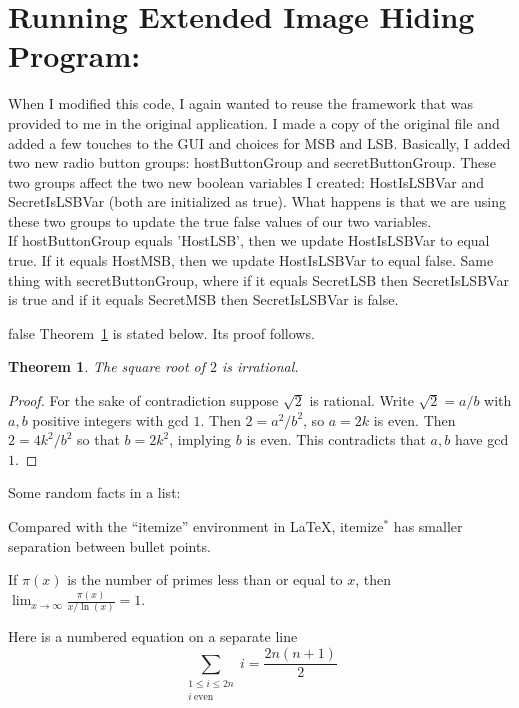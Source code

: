 \documentclass[10pt]{article}
\newenvironment{itemize*}%
  {\vspace{-2ex} \begin{itemize} %
     \setlength{\itemsep}{-1ex} \setlength{\parsep}{0pt}}%
  {\end{itemize}}
\newtheorem{theorem}{Theorem}
\begin{document}
\section{Running Extended Image Hiding Program:}
\noindent When I modified this code, I again wanted to reuse the framework that was provided to me in the original application. I made a copy of the original file and added a few touches to the GUI and choices for MSB and LSB. Basically, I added two new radio button groups: hostButtonGroup and secretButtonGroup. These two groups affect the two new boolean variables I created: HostIsLSBVar and SecretIsLSBVar (both are initialized as true). What happens is that we are using these two groups to update the true false values of our two variables. \\ 
If hostButtonGroup equals 'HostLSB', then we update HostIsLSBVar to equal true. If it equals HostMSB, then we update HostIsLSBVar to equal false. Same thing with secretButtonGroup, where if it equals SecretLSB then SecretIsLSBVar is true and if it equals SecretMSB then SecretIsLSBVar is false. 


\vspace{1in}







\if false
Theorem~\ref{th:root} is stated below. Its proof follows.

\begin{theorem}
	The square root of $2$ is irrational.
	\label{th:root}
\end{theorem}

\begin{proof}
For the sake of contradiction suppose $\sqrt{2}$ is rational. Write $\sqrt{2} = a/b$ with $a,b$ positive integers with gcd $1$. Then $2 = a^2/b^2$, so $a = 2k$ is even. Then $2 = 4k^2/b^2$ so that $b = 2k^2$, implying $b$ is even. This contradicts that $a,b$ have gcd $1$.
\end{proof}

Some random facts in a list:

\begin{itemize*}
	\item Compared with the ``itemize'' environment in \LaTeX, itemize$^*$ has smaller separation between bullet points.
	\item If $\pi(x)$ is the number of primes less than or equal to $x$, then
$\lim_{x\rightarrow\infty} \frac{\pi(x)}{x/\ln(x)} = 1$.
	\item Here is a numbered equation on a separate line 
	\begin{equation}
		\sum_{\substack{1\le i\le 2n\\i\ \mathrm{even}}} i = \frac{2n(n+1)}2
	\end{equation}
\end{itemize*}
\fi
\end{document}

